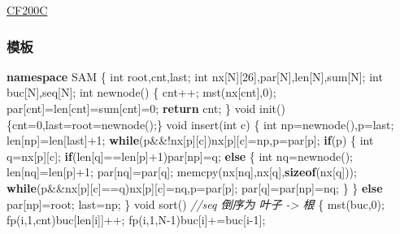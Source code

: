 \documentclass[
]{article}
\newenvironment{Shaded}{}{}
\newcommand{\CommentTok}[1]{\textcolor[rgb]{0.38,0.63,0.69}{\textit{#1}}}
\newcommand{\ControlFlowTok}[1]{\textcolor[rgb]{0.00,0.44,0.13}{\textbf{#1}}}
\newcommand{\DataTypeTok}[1]{\textcolor[rgb]{0.56,0.13,0.00}{#1}}
\newcommand{\DecValTok}[1]{\textcolor[rgb]{0.25,0.63,0.44}{#1}}
\newcommand{\KeywordTok}[1]{\textcolor[rgb]{0.00,0.44,0.13}{\textbf{#1}}}
\newcommand{\NormalTok}[1]{#1}
\begin{document}
\href{https://codeforces.com/contest/235/problem/C}{CF200C}

\hypertarget{ux6a21ux677f-8}{%
\subsubsection{模板}\label{ux6a21ux677f-8}}

\begin{Shaded}
\begin{Highlighting}[]
\KeywordTok{namespace}\NormalTok{ SAM}
\NormalTok{\{}
    \DataTypeTok{int}\NormalTok{ root,cnt,last;}
    \DataTypeTok{int}\NormalTok{ nx[N][}\DecValTok{26}\NormalTok{],par[N],len[N],sum[N];}
    \DataTypeTok{int}\NormalTok{ buc[N],seq[N];}
    \DataTypeTok{int}\NormalTok{ newnode()}
\NormalTok{    \{}
\NormalTok{        cnt++;}
\NormalTok{        mst(nx[cnt],}\DecValTok{0}\NormalTok{);}
\NormalTok{        par[cnt]=len[cnt]=sum[cnt]=}\DecValTok{0}\NormalTok{;        }
        \ControlFlowTok{return}\NormalTok{ cnt;}
\NormalTok{    \}}
    \DataTypeTok{void}\NormalTok{ init()\{cnt=}\DecValTok{0}\NormalTok{,last=root=newnode();\}}
    \DataTypeTok{void}\NormalTok{ insert(}\DataTypeTok{int}\NormalTok{ c)}
\NormalTok{    \{}
        \DataTypeTok{int}\NormalTok{ np=newnode(),p=last;}
\NormalTok{        len[np]=len[last]+}\DecValTok{1}\NormalTok{;}
        \ControlFlowTok{while}\NormalTok{(p\&\&!nx[p][c])nx[p][c]=np,p=par[p];}
        \ControlFlowTok{if}\NormalTok{(p)}
\NormalTok{        \{}
            \DataTypeTok{int}\NormalTok{ q=nx[p][c];}
            \ControlFlowTok{if}\NormalTok{(len[q]==len[p]+}\DecValTok{1}\NormalTok{)par[np]=q;}
            \ControlFlowTok{else}
\NormalTok{            \{}
                \DataTypeTok{int}\NormalTok{ nq=newnode();}
\NormalTok{                len[nq]=len[p]+}\DecValTok{1}\NormalTok{;}
\NormalTok{                par[nq]=par[q];}
\NormalTok{                memcpy(nx[nq],nx[q],}\KeywordTok{sizeof}\NormalTok{(nx[q]));}
                \ControlFlowTok{while}\NormalTok{(p\&\&nx[p][c]==q)nx[p][c]=nq,p=par[p];}
\NormalTok{                par[q]=par[np]=nq;}
\NormalTok{            \}}
\NormalTok{        \}}
        \ControlFlowTok{else}\NormalTok{ par[np]=root;}
\NormalTok{        last=np;}
\NormalTok{    \}}
    \DataTypeTok{void}\NormalTok{ sort() }\CommentTok{//seq 倒序为 叶子 {-}\textgreater{} 根}
\NormalTok{    \{}
\NormalTok{        mst(buc,}\DecValTok{0}\NormalTok{);}
\NormalTok{        fp(i,}\DecValTok{1}\NormalTok{,cnt)buc[len[i]]++;}
\NormalTok{        fp(i,}\DecValTok{1}\NormalTok{,N{-}}\DecValTok{1}\NormalTok{)buc[i]+=buc[i{-}}\DecValTok{1}\NormalTok{];}

\end{Highlighting}
\end{Shaded}
\end{document}
